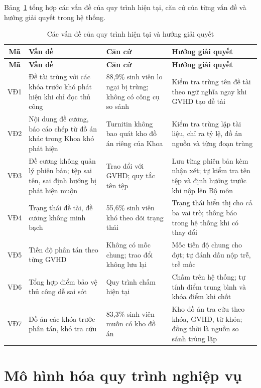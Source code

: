 \documentclass[../main.tex]{subfiles}
\begin{document}
Bảng~\ref{tab:c2-van-de} tổng hợp các vấn đề của quy trình hiện tại, căn cứ của từng vấn đề và hướng giải quyết trong hệ thống.

{\renewcommand{\arraystretch}{1.2}
\begin{longtable}{|c|p{4.2cm}|p{4.2cm}|p{4.95cm}|}
\caption{Các vấn đề của quy trình hiện tại và hướng giải quyết}\label{tab:c2-van-de}\\
\hline
\textbf{Mã} & \textbf{Vấn đề} & \textbf{Căn cứ} & \textbf{Hướng giải quyết} \\
\hline
\endfirsthead
\hline
\textbf{Mã} & \textbf{Vấn đề} & \textbf{Căn cứ} & \textbf{Hướng giải quyết} \\
\hline
\endhead
VĐ1 & Đề tài trùng với các khóa trước khó phát hiện khi chỉ đọc thủ công & 88,9\% sinh viên lo ngại bị trùng; không có công cụ so sánh & Kiểm tra trùng tên đề tài theo ngữ nghĩa ngay khi GVHD tạo đề tài \\
\hline
VĐ2 & Nội dung đề cương, báo cáo chép từ đồ án khác trong Khoa khó phát hiện & Turnitin không bao quát kho đồ án riêng của Khoa & Kiểm tra trùng lặp tài liệu, chỉ ra tỷ lệ, đồ án nguồn và từng đoạn trùng \\
\hline
VĐ3 & Đề cương không quản lý phiên bản; tệp sai tên, sai định hướng bị phát hiện muộn & Trao đổi với GVHD; quy tắc tên tệp & Lưu từng phiên bản kèm nhận xét; tự kiểm tra tên tệp và định hướng trước khi nộp lên Bộ môn \\
\hline
VĐ4 & Trạng thái đề tài, đề cương không minh bạch & 55,6\% sinh viên khó theo dõi trạng thái & Trạng thái hiển thị cho cả ba vai trò; thông báo trong hệ thống khi có thay đổi \\
\hline
VĐ5 & Tiến độ phân tán theo từng GVHD & Không có mốc chung; trao đổi không lưu lại & Mốc tiến độ chung cho đợt; tự đánh dấu nộp trễ, trễ mốc \\
\hline
VĐ6 & Tổng hợp điểm bảo vệ thủ công dễ sai sót & Quy trình chấm hiện tại & Chấm trên hệ thống; tự tính điểm trung bình và khóa điểm khi chốt \\
\hline
VĐ7 & Đồ án các khóa trước phân tán, khó tra cứu & 83,3\% sinh viên muốn có kho đồ án & Kho đồ án tra cứu theo khóa, GVHD, từ khóa; đồng thời là nguồn so sánh trùng lặp \\
\hline
\end{longtable}
}

\section{Mô hình hóa quy trình nghiệp vụ}\label{sec:c2-bpmn}
\end{document}
